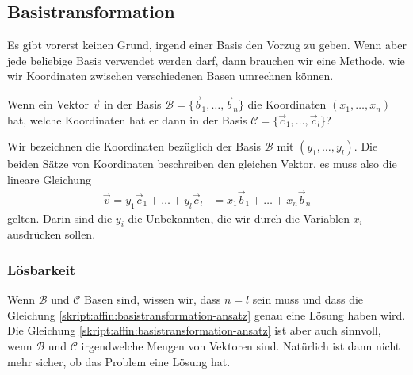 %
%
\subsection{Basistransformation\label{subsection:basistransformation}}
Es gibt vorerst keinen Grund, irgend einer Basis den Vorzug zu geben.
Wenn aber jede beliebige Basis verwendet werden darf, dann
brauchen wir eine Methode, wie wir Koordinaten zwischen verschiedenen
Basen umrechnen können.

\begin{aufgabe}
\label{skript:affin:basiswechsel:aufgabe}
Wenn ein Vektor $\vec{v}$ in der Basis
$\mathcal{B}=\{\vec{b}_1,\dots,\vec{b}_n\}$
die Koordinaten $(x_1,\dots,x_n)$ hat, welche Koordinaten hat er dann in
der Basis $\mathcal{C}=\{\vec{c}_1,\dots,\vec{c}_l\}$?
\end{aufgabe}

Wir bezeichnen die Koordinaten bezüglich der Basis $\mathcal{B}$
mit $(y_1,\dots,y_l)$.
Die beiden Sätze von Koordinaten beschreiben den gleichen Vektor,
es muss also die lineare Gleichung
\begin{align}
\vec{v}
=
y_1\vec{c}_1 + \dots + y_l\vec{c}_l
&=
x_1\vec{b}_1 + \dots + x_n\vec{b}_n
\label{skript:affin:basistransformation-ansatz}
\end{align}
gelten.
Darin sind die $y_i$ die Unbekannten, die wir durch die Variablen $x_i$
ausdrücken sollen.

\subsubsection{Lösbarkeit}
Wenn $\mathcal{B}$ und $\mathcal{C}$ Basen sind, wissen wir, dass
$n=l$ sein muss und dass die Gleichung
\eqref{skript:affin:basistransformation-ansatz}
genau eine Lösung haben wird.
Die Gleichung
\eqref{skript:affin:basistransformation-ansatz}
ist aber auch sinnvoll, wenn $\mathcal{B}$ und $\mathcal{C}$ irgendwelche
Mengen von Vektoren sind.
Natürlich ist dann nicht mehr sicher, ob das Problem eine Lösung hat.

